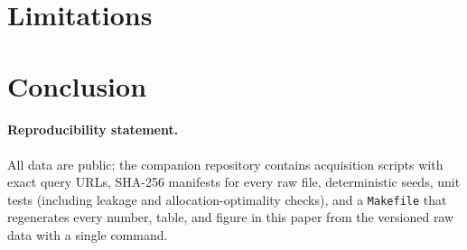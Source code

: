 \documentclass[11pt]{article}
\begin{document}
\section{Limitations}


\section{Conclusion}


\paragraph{Reproducibility statement.}
All data are public; the companion repository contains acquisition scripts
with exact query URLs, SHA-256 manifests for every raw file, deterministic
seeds, unit tests (including leakage and allocation-optimality checks), and
a \texttt{Makefile} that regenerates every number, table, and figure in
this paper from the versioned raw data with a single command.



\end{document}

